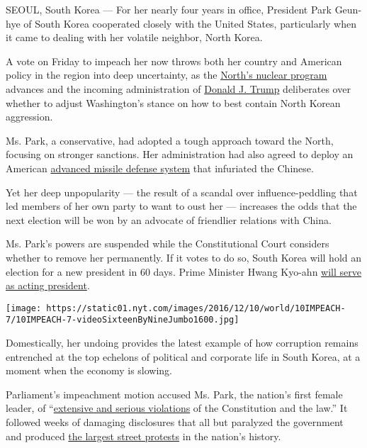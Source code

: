 SEOUL, South Korea --- For her nearly four years in office, President
Park Geun-hye of South Korea cooperated closely with the United States,
particularly when it came to dealing with her volatile neighbor, North
Korea.

A vote on Friday to impeach her now throws both her country and American
policy in the region into deep uncertainty, as the
\href{https://www.nytimes.com/topic/subject/north-koreas-nuclear-program}{North's
nuclear program} advances and the incoming administration of
\href{http://www.nytimes.com/topic/person/donald-trump}{Donald J. Trump}
deliberates over whether to adjust Washington's stance on how to best
contain North Korean aggression.

Ms. Park, a conservative, had adopted a tough approach toward the North,
focusing on stronger sanctions. Her administration had also agreed to
deploy an American
\href{https://www.nytimes.com/2016/07/08/world/asia/south-korea-and-us-agree-to-deploy-missile-defense-system.html}{advanced
missile defense system} that infuriated the Chinese.

Yet her deep unpopularity --- the result of a scandal over
influence-peddling that led members of her own party to want to oust her
--- increases the odds that the next election will be won by an advocate
of friendlier relations with China.

Ms. Park's powers are suspended while the Constitutional Court considers
whether to remove her permanently. If it votes to do so, South Korea
will hold an election for a new president in 60 days. Prime Minister
Hwang Kyo-ahn
\href{https://www.nytimes.com/2016/12/09/world/asia/south-korea-who-could-replace-park.html}{will
serve as acting president}.

\texttt{[image: https://static01.nyt.com/images/2016/12/10/world/10IMPEACH-7/10IMPEACH-7-videoSixteenByNineJumbo1600.jpg]}

Domestically, her undoing provides the latest example of how corruption
remains entrenched at the top echelons of political and corporate life
in South Korea, at a moment when the economy is slowing.

Parliament's impeachment motion accused Ms. Park, the nation's first
female leader, of
``\href{https://www.nytimes.com/2016/12/08/world/asia/south-korea-park-geun-hye-accusations-impeachment.html}{extensive
and serious violations} of the Constitution and the law.'' It followed
weeks of damaging disclosures that all but paralyzed the government and
produced
\href{https://www.nytimes.com/2016/11/26/world/asia/korea-park-geun-hye-protests.html}{the
largest street protests} in the nation's history.

